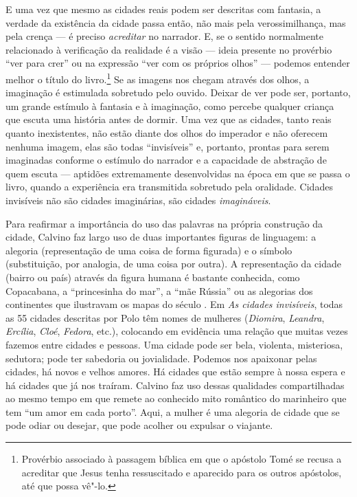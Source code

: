E uma vez que mesmo as cidades reais podem ser descritas com fantasia, a
verdade da existência da cidade passa então, não mais pela
verossimilhança, mas pela crença --- é preciso \emph{acreditar} no
narrador. E, se o sentido normalmente relacionado à verificação da
realidade é a visão --- ideia presente no provérbio ``ver para crer'' ou
na expressão ``ver com os próprios olhos'' --- podemos entender melhor o
título do livro.\footnote{Provérbio associado à passagem bíblica em que
  o apóstolo Tomé se recusa a acreditar que Jesus tenha ressuscitado e
  aparecido para os outros apóstolos, até que possa vê"-lo.} Se as
imagens nos chegam através dos olhos, a imaginação é estimulada
sobretudo pelo ouvido. Deixar de ver pode ser, portanto, um grande
estímulo à fantasia e à imaginação, como percebe qualquer criança que
escuta uma história antes de dormir. Uma vez que as cidades, tanto reais
quanto inexistentes, não estão diante dos olhos do imperador e não
oferecem nenhuma imagem, elas são todas ``invisíveis'' e, portanto,
prontas para serem imaginadas conforme o estímulo do narrador e a
capacidade de abstração de quem escuta --- aptidões extremamente
desenvolvidas na época em que se passa o livro, quando a experiência era
transmitida sobretudo pela oralidade. Cidades invisíveis não são cidades
imaginárias, são cidades \emph{imagináveis}.

Para reafirmar a importância do uso das palavras na própria construção
da cidade, Calvino faz largo uso de duas importantes figuras de
linguagem: a alegoria (representação de uma coisa de forma figurada) e o
símbolo (substituição, por analogia, de uma coisa por outra). A
representação da cidade (bairro ou país) através da figura humana é
bastante conhecida, como Copacabana, a ``princesinha do mar'', a ``mãe
Rússia'' ou as alegorias dos continentes que ilustravam os mapas do
século . Em \emph{As cidades invisíveis}, todas as 55 cidades
descritas por Polo têm nomes de mulheres (\emph{Diomira},
\emph{Leandra}, \emph{Ercília}, \emph{Cloé}, \emph{Fedora}, etc.),
colocando em evidência uma relação que muitas vezes fazemos entre
cidades e pessoas. Uma cidade pode ser bela, violenta, misteriosa,
sedutora; pode ter sabedoria ou jovialidade. Podemos nos apaixonar pelas
cidades, há novos e velhos amores. Há cidades que estão sempre à nossa
espera e há cidades que já nos traíram. Calvino faz uso dessas
qualidades compartilhadas ao mesmo tempo em que remete ao conhecido mito
romântico do marinheiro que tem ``um amor em cada porto''. Aqui, a
mulher é uma alegoria de cidade que se pode odiar ou desejar, que pode
acolher ou expulsar o viajante.

